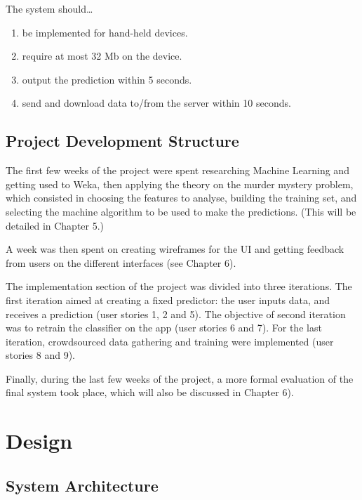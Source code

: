 \documentclass{mproj}
\begin{document}
The system should\ldots
\begin{enumerate}
	\item be implemented for hand-held devices.
	\item require at most 32 Mb on the device.
	\item output the prediction within 5 seconds.
	\item send and download data to/from the server within 10 seconds.
\end{enumerate}
	
\section{Project Development Structure}
	
The first few weeks of the project were spent researching Machine Learning and getting used to Weka, then applying the theory on the murder mystery problem, which consisted in choosing the features to analyse, building the training set, and selecting the machine algorithm to be used to make the predictions. (This will be detailed in Chapter 5.) \par
	
A week was then spent on creating wireframes for the UI and getting feedback from users on the different interfaces (see Chapter 6). \par
	
The implementation section of the project was divided into three iterations. 
The first iteration aimed at creating a fixed predictor: the user inputs data, and receives a prediction (user stories 1, 2 and 5). 
The objective of second iteration was to retrain the classifier on the app (user stories 6 and 7). 
For the last iteration, crowdsourced data gathering and training were implemented (user stories 8 and 9). \par
	
Finally, during the last few weeks of the project, a more formal evaluation of the final system took place, which will also be discussed in Chapter 6).


\chapter{Design}

\section{System Architecture}
\end{document}
